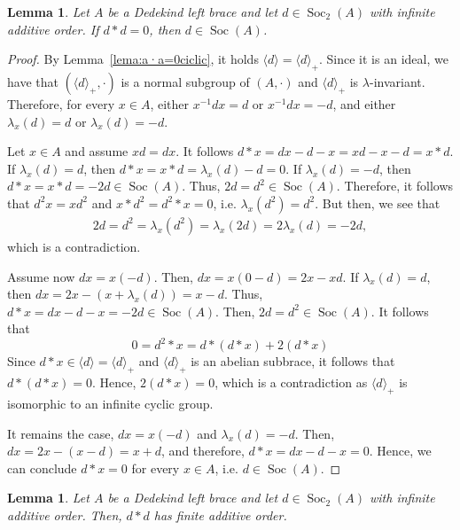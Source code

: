 \documentclass[12pt, a4paper, english]{article}
\newtheorem{lema}[teorema]{Lemma}
\theoremstyle{definition}
\DeclareMathOperator{\Soc}{Soc}
\begin{document}
\begin{lema}
\label{lema:dinSoc2+order-inf+dastd=0->dinS}
Let $A$ be a Dedekind left brace and let $d\in \Soc_2(A)$ with infinite additive order. If $d \ast d = 0$, then $d \in \Soc(A)$.
\end{lema}

\begin{proof}
By Lemma~\ref{lema:a·a=0ciclic}, it holds $\langle d \rangle = \langle d \rangle_+$. Since it is an ideal, we have that $(\langle d \rangle_+, \cdot)$ is a normal subgroup of $(A,\cdot)$ and $\langle d \rangle_+$ is $\lambda$-invariant. Therefore, for every $x\in A$, either $x^{-1}dx = d$ or $x^{-1}dx = -d$, and either $\lambda_x(d) = d$ or $\lambda_x(d) = -d$.

Let $x \in A$ and assume $xd = dx$. It follows $d \ast x = dx -d - x = xd -x  -d = x \ast d$. If $\lambda_x(d) = d$, then $d \ast x = x \ast d = \lambda_x(d) - d = 0$. If $\lambda_x(d) = - d$, then $d \ast x = x \ast d = -2d \in \Soc(A)$. Thus, $2d = d^2 \in \Soc(A)$. Therefore, it follows that $d^2x = xd^2$ and $x\ast d^2 = d^2\ast x = 0$, i.e. $\lambda_x(d^2) = d^2$. But then, we see that
\begin{align*}
2d = d^2 = \lambda_x(d^2) = \lambda_x(2d) = 2\lambda_x(d) = -2d,
\end{align*}
which is a contradiction.

Assume now $dx = x(-d)$. Then, $dx = x(0-d) = 2x - xd$. If $\lambda_x(d)  = d$, then $dx = 2x - (x + \lambda_x(d)) = x - d$. Thus, $d \ast x = dx -d -x = -2d \in \Soc(A)$. Then, $2d = d^2 \in \Soc(A)$. It follows that
\[ 0 = d^2 \ast x =  d \ast (d \ast x) + 2(d\ast x) \]
Since $d \ast x \in \langle d \rangle = \langle d \rangle_+$ and $\langle d \rangle_+$ is an abelian subbrace, it follows that $d \ast (d \ast x) = 0$. Hence, $2(d\ast x) = 0$, which is a contradiction as $\langle d \rangle_+$  is isomorphic to an infinite cyclic group.

It remains the case, $dx = x(-d)$ and $\lambda_x(d) = -d$. Then, $dx = 2x - (x-d) = x+d$, and therefore, $d\ast x = dx -d -x = 0$. Hence, we can conclude $d\ast x = 0$ for every $x\in A$, i.e. $d \in \Soc(A)$.
\end{proof}

\begin{lema}
\label{lema:2.3nou}
Let $A$ be a Dedekind left brace and let $d\in \Soc_2(A)$ with infinite additive order. Then, $d \ast d$ has finite additive order.
\end{lema}
\end{document}
